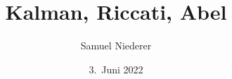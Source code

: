 %
%
%


\beamertemplatenavigationsymbolsempty
\title[KRA]{Kalman, Riccati, Abel}
\author[S.~Niederer]{Samuel Niederer}
\date[]{3.~Juni 2022}

